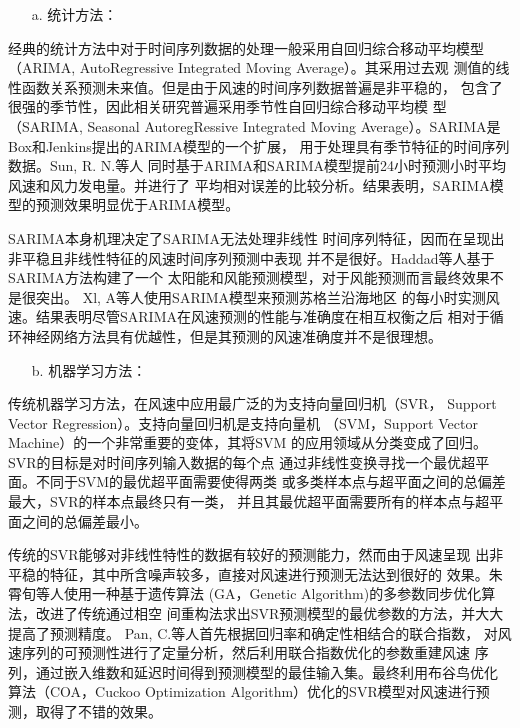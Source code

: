 \documentclass[AutoFakeBold]{LZUThesis}
\begin{document}
\begin{itemize}
\item[a. ] 统计方法：
\end{itemize}

经典的统计方法中对于时间序列数据的处理一般采用自回归综合移动平均模型
（ARIMA, AutoRegressive Integrated Moving Average）。其采用过去观
测值的线性函数关系预测未来值。但是由于风速的时间序列数据普遍是非平稳的，
包含了很强的季节性，因此相关研究普遍采用季节性自回归综合移动平均模
型（SARIMA, Seasonal AutoregRessive Integrated 
Moving Average）。SARIMA是Box和Jenkins提出的ARIMA模型的一个扩展，
用于处理具有季节特征的时间序列数据。Sun, R. N.等人
同时基于ARIMA和SARIMA模型提前24小时预测小时平均风速和风力发电量。并进行了
平均相对误差的比较分析。结果表明，SARIMA模型的预测效果明显优于ARIMA模型。

SARIMA本身机理决定了SARIMA无法处理非线性
时间序列特征，因而在呈现出非平稳且非线性特征的风速时间序列预测中表现
并不是很好。Haddad等人基于SARIMA方法构建了一个
太阳能和风能预测模型，对于风能预测而言最终效果不是很突出。
Xl, A等人使用SARIMA模型来预测苏格兰沿海地区
的每小时实测风速。结果表明尽管SARIMA在风速预测的性能与准确度在相互权衡之后
相对于循环神经网络方法具有优越性，但是其预测的风速准确度并不是很理想。

\begin{itemize}
\item[b. ] 机器学习方法：
\end{itemize}
 
传统机器学习方法，在风速中应用最广泛的为支持向量回归机（SVR，
Support Vector Regression）。支持向量回归机是支持向量机
（SVM，Support Vector Machine）的一个非常重要的变体，其将SVM
的应用领域从分类变成了回归。SVR的目标是对时间序列输入数据的每个点
通过非线性变换寻找一个最优超平面。不同于SVM的最优超平面需要使得两类
或多类样本点与超平面之间的总偏差最大，SVR的样本点最终只有一类，
并且其最优超平面需要所有的样本点与超平面之间的总偏差最小。

传统的SVR能够对非线性特性的数据有较好的预测能力，然而由于风速呈现
出非平稳的特征，其中所含噪声较多，直接对风速进行预测无法达到很好的
效果。朱霄旬等人使用一种基于遗传算法
(GA，Genetic Algorithm)的多参数同步优化算法，改进了传统通过相空
间重构法求出SVR预测模型的最优参数的方法，并大大提高了预测精度。
Pan, C.等人首先根据回归率和确定性相结合的联合指数，
对风速序列的可预测性进行了定量分析，然后利用联合指数优化的参数重建风速
序列，通过嵌入维数和延迟时间得到预测模型的最佳输入集。最终利用布谷鸟优化
算法（COA，Cuckoo Optimization Algorithm）优化的SVR模型对风速进行预
测，取得了不错的效果。
\end{document}

